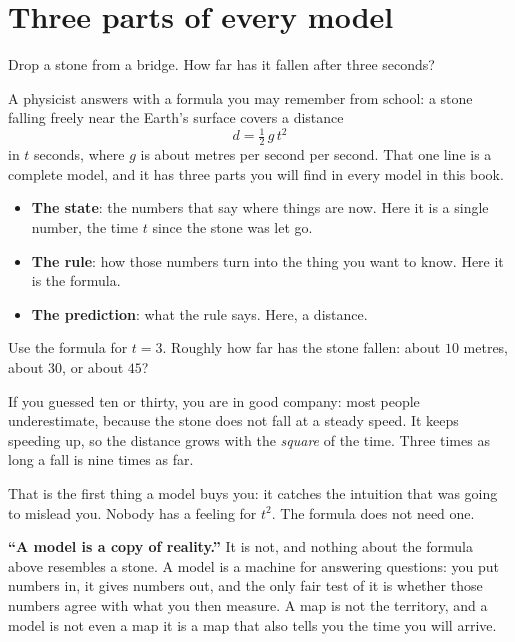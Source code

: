 \section{Three parts of every model}
\label{sec:ch01-parts}

\noindent
Drop a stone from a bridge. How far has it fallen after three seconds?

A physicist answers with a formula you may remember from school: a stone
falling freely near the Earth's surface covers a distance
\[ d = \tfrac{1}{2}\, g\, t^{2} \]
in $t$ seconds, where $g$ is about  metres per second per second.
That one line is a complete model, and it has three parts you will find in
every model in this book.

\begin{itemize}
\item \textbf{The state}: the numbers that say where things are now. Here it
  is a single number, the time $t$ since the stone was let go.
\item \textbf{The rule}: how those numbers turn into the thing you want to
  know. Here it is the formula.
\item \textbf{The prediction}: what the rule says. Here, a distance.
\end{itemize}

\begin{think}
Use the formula for $t = 3$. Roughly how far has the stone fallen: about
$10$ metres, about $30$, or about $45$?
\end{think}
If you guessed ten or thirty, you are in good company: most people
underestimate, because the stone does not fall at a steady speed. It keeps
speeding up, so the distance grows with the \emph{square} of the time. Three
times as long a fall is nine times as far.

That is the first thing a model buys you: it catches the intuition that was
going to mislead you. Nobody has a feeling for $t^{2}$. The formula does not
need one.

\begin{trapbox}
\textbf{\enquote{A model is a copy of reality.}} It is not, and nothing about
the formula above resembles a stone. A model is a machine for answering
questions: you put numbers in, it gives numbers out, and the only fair test
of it is whether those numbers agree with what you then measure. A map is
not the territory, and a model is not even a map \dash{} it is a map that
also tells you the time you will arrive.
\end{trapbox}

